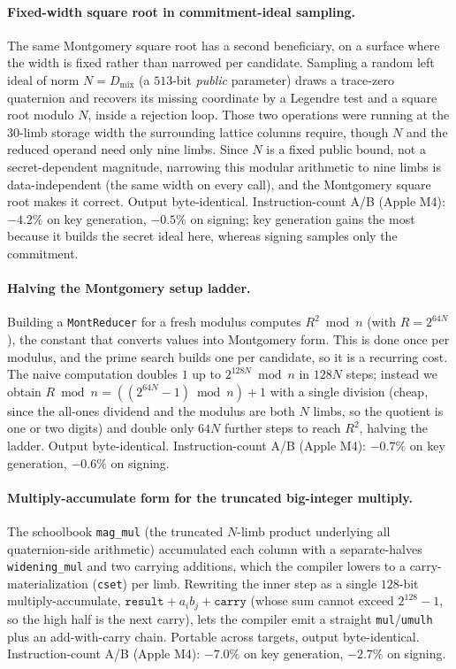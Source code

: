 \paragraph{Fixed-width square root in commitment-ideal sampling.}
The same Montgomery square root has a second beneficiary, on a surface
where the width is fixed rather than narrowed per candidate.  Sampling
a random left ideal of norm $N = D_{\mathrm{mix}}$ (a $513$-bit
\emph{public} parameter) draws a trace-zero quaternion and recovers its
missing coordinate by a Legendre test and a square root modulo $N$,
inside a rejection loop.  Those two operations were running at the
$30$-limb storage width the surrounding lattice columns require, though
$N$ and the reduced operand need only nine limbs.  Since $N$ is a fixed
public bound, not a secret-dependent magnitude, narrowing this modular
arithmetic to nine limbs is data-independent (the same width on every
call), and the Montgomery square root makes it correct.  Output
byte-identical.  Instruction-count A/B (Apple M4): $-4.2\%$ on key
generation, $-0.5\%$ on signing; key generation gains the most because
it builds the secret ideal here, whereas signing samples only the
commitment.

\paragraph{Halving the Montgomery setup ladder.}
Building a \texttt{MontReducer} for a fresh modulus computes $R^2 \bmod n$
(with $R = 2^{64N}$), the constant that converts values into Montgomery
form.  This is done once per modulus, and the prime search builds one
per candidate, so it is a recurring cost.  The naive computation doubles
$1$ up to $2^{128N} \bmod n$ in $128N$ steps; instead we obtain $R \bmod
n = ((2^{64N} - 1) \bmod n) + 1$ with a single division (cheap, since the
all-ones dividend and the modulus are both $N$ limbs, so the quotient is
one or two digits) and double only $64N$ further steps to reach $R^2$,
halving the ladder.  Output byte-identical.  Instruction-count A/B
(Apple M4): $-0.7\%$ on key generation, $-0.6\%$ on signing.

\paragraph{Multiply-accumulate form for the truncated big-integer
multiply.}
The schoolbook \texttt{mag\_mul} (the truncated $N$-limb product
underlying all quaternion-side arithmetic) accumulated each column with
a separate-halves \texttt{widening\_mul} and two carrying additions,
which the compiler lowers to a carry-materialization (\texttt{cset})
per limb.  Rewriting the inner step as a single $128$-bit
multiply-accumulate, $\texttt{result} + a_i b_j + \texttt{carry}$
(whose sum cannot exceed $2^{128}-1$, so the high half is the next
carry), lets the compiler emit a straight \texttt{mul}/\texttt{umulh}
plus an add-with-carry chain.  Portable across targets, output
byte-identical.  Instruction-count A/B (Apple M4): $-7.0\%$ on key
generation, $-2.7\%$ on signing.

